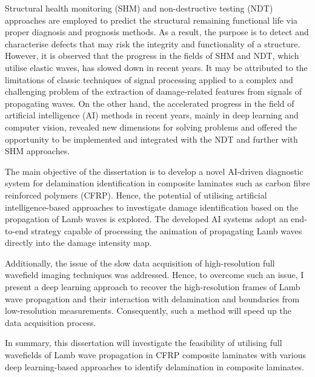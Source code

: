 {	
	Structural health monitoring (SHM) and non-destructive testing (NDT) approaches are employed to predict the structural remaining functional life via proper diagnosis and prognosis methods.
	As a result, the purpose is to detect and characterise defects that may risk the integrity and functionality of a structure.
	However, it is observed that the progress in the fields of SHM and NDT, which utilise elastic waves, has slowed down in recent years.
	It may be attributed to the limitations of classic techniques of signal processing applied to a complex and challenging problem of the extraction of damage-related features from signals of propagating waves.
	On the other hand, the accelerated progress in the field of artificial intelligence (AI) methods in recent years, mainly in deep learning and computer vision, revealed new dimensions for solving problems and offered the opportunity to be implemented and integrated with the NDT and further with SHM approaches.
	
	The main objective of the dissertation is to develop a novel AI-driven diagnostic system for delamination identification in composite laminates such as carbon fibre reinforced polymers (CFRP).
	Hence, the potential of utilising artificial intelligence-based approaches to investigate damage identification based on the propagation of Lamb waves is explored.
	The developed AI systems adopt an end-to-end strategy capable of processing the animation of propagating Lamb waves directly into the damage intensity map.
	
	Additionally, the issue of the slow data acquisition of high-resolution full wavefield imaging techniques was addressed.
	Hence, to overcome such an issue, I present a deep learning approach to recover the high-resolution frames of Lamb wave propagation and their interaction with delamination and boundaries from low-resolution measurements.
	Consequently, such a method will speed up the data acquisition process.
	
	In summary, this dissertation will investigate the feasibility of utilising full wavefields of Lamb wave propagation in CFRP composite laminates with various deep learning-based approaches to identify delamination in composite laminates.
	
}
